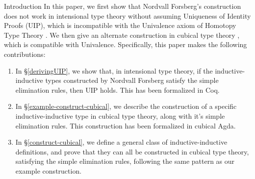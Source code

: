\documentclass[acmsmall,review]{acmart}\settopmatter{printfolios=true,printccs=false,printacmref=false}
\def\Forsberg/{Nordvall Forsberg}
\begin{document}
\begin{section}{Introduction}
In this paper, we first show that \Forsberg/'s construction does not work in intensional type theory without assuming Uniqueness of Identity Proofs (UIP), which is incompatible with the Univalence axiom of Homotopy Type Theory \citep{hottbook}. We then give an alternate construction in cubical type theory \citep{cubicaltt_ifcolog}, which is compatible with Univalence.
Specifically, this paper makes the following contributions:
\begin{enumerate}
    \item In \S\ref{derivingUIP}, we show that, in intensional type theory, if the inductive-inductive types constructed by \Forsberg/ satisfy the simple elimination rules, then UIP holds. This has been formalized in Coq.
    \item In \S\ref{example-construct-cubical}, we describe the construction of a specific inductive-inductive type in cubical type theory, along with it's simple elimination rules. This construction has been formalized in cubical Agda.
    \item In \S\ref{construct-cubical}, we define a general class of inductive-inductive definitions, and prove that they can all be constructed in cubical type theory, satisfying the simple elimination rules, following the same pattern as our example construction.
\end{enumerate}

\end{section}
\end{document}
